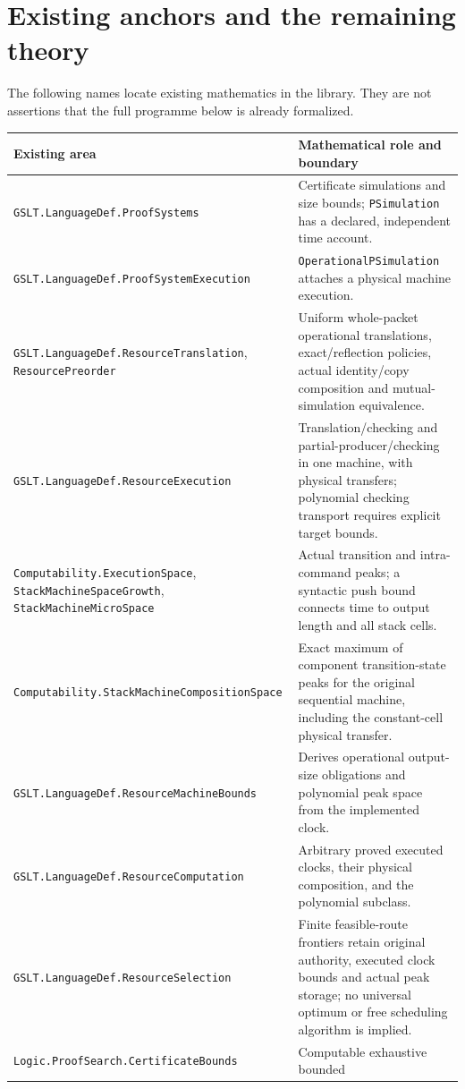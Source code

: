 \documentclass[11pt]{article}
\newcommand{\code}[1]{\nolinkurl{#1}}
\begin{document}
\section{Existing anchors and the remaining theory}
The following names locate existing mathematics in the library. They are
not assertions that the full programme below is already formalized.
{\small
\begin{longtable}{>{\raggedright\arraybackslash}p{.39\linewidth}>{\raggedright\arraybackslash}p{.55\linewidth}}
\toprule
Existing area & Mathematical role and boundary\\\midrule
\code{GSLT.LanguageDef.ProofSystems} & Certificate simulations and size
  bounds; \code{PSimulation} has a declared, independent time account.\\
\code{GSLT.LanguageDef.ProofSystemExecution} &
  \code{OperationalPSimulation} attaches a physical machine execution.\\
\code{GSLT.LanguageDef.ResourceTranslation}, \code{ResourcePreorder} &
  Uniform whole-packet operational translations, exact/reflection policies,
  actual identity/copy composition and mutual-simulation equivalence.\\
\code{GSLT.LanguageDef.ResourceExecution} & Translation/checking and
  partial-producer/checking in one machine, with physical transfers;
  polynomial checking transport requires explicit target bounds.\\
\code{Computability.ExecutionSpace}, \code{StackMachineSpaceGrowth},
  \code{StackMachineMicroSpace} & Actual transition and intra-command peaks;
  a syntactic push bound connects time to output length and all stack cells.\\
\code{Computability.StackMachineCompositionSpace} & Exact maximum of
  component transition-state peaks for the original sequential machine,
  including the constant-cell physical transfer.\\
\code{GSLT.LanguageDef.ResourceMachineBounds} & Derives operational output-size
  obligations and polynomial peak space from the implemented clock.\\
\code{GSLT.LanguageDef.ResourceComputation} & Arbitrary proved executed clocks,
  their physical composition, and the polynomial subclass.\\
\code{GSLT.LanguageDef.ResourceSelection} & Finite feasible-route frontiers
  retain original authority, executed clock bounds and actual peak storage;
  no universal optimum or free scheduling algorithm is implied.\\
\code{Logic.ProofSearch.CertificateBounds} & Computable exhaustive bounded

\end{longtable}}
\end{document}
